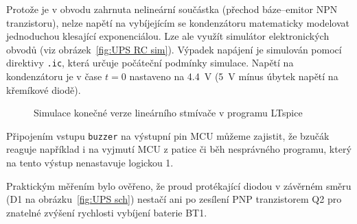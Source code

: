 Protože je v obvodu zahrnuta nelineární součástka (přechod báze--emitor NPN
tranzistoru), nelze napětí na vybíjejícím se kondenzátoru matematicky modelovat
jednoduchou klesající exponenciálou. Lze ale využít simulátor elektronických
obvodů (viz obrázek~\vref{fig:UPS RC sim}). Výpadek napájení je simulován
pomocí direktivy \verb|.ic|, která určuje počáteční podmínky simulace. Napětí
na kondenzátoru je v čase $t=0$ nastaveno na \SI{4,4}{\volt} (\SI{5}{\volt}
mínus úbytek napětí na křemíkové diodě).

\begin{figure}
    \centering
    \caption{Simulace konečné verze lineárního stmívače v programu LTspice}
    \label{fig:UPS RC sim}
\end{figure}

Připojením vstupu \texttt{buzzer} na výstupní pin MCU můžeme zajistit, že
bzučák reaguje například i na vyjmutí MCU z patice či běh nesprávného programu,
který na tento výstup nenastavuje logickou 1.

Praktickým měřením bylo ověřeno, že proud protékající diodou v závěrném směru
(D1 na obrázku~\vref{fig:UPS sch}) nestačí ani po zesílení PNP tranzistorem Q2
pro znatelné zvýšení rychlosti vybíjení baterie BT1.
